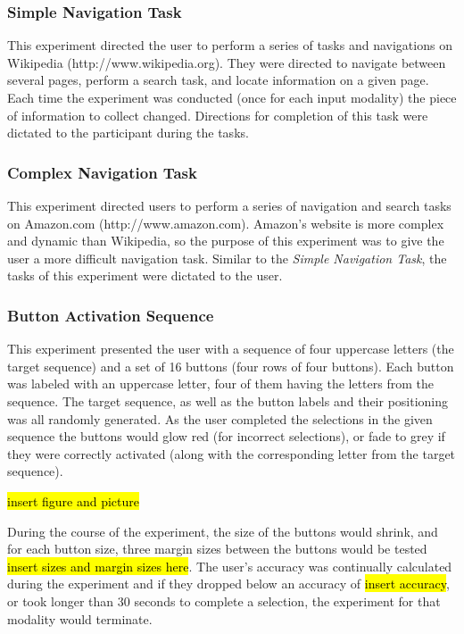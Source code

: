 \documentclass{sigchi}
\begin{document}
\subsubsection{Simple Navigation Task}
This experiment directed the user to perform a series of tasks and 
navigations on Wikipedia (http://www.wikipedia.org). They were directed
to navigate between several pages, perform a search task, and locate
information on a given page. Each time the experiment was conducted (once
for each input modality) the piece of information to collect changed.
Directions for completion of this task were dictated to the participant
during the tasks.

\subsubsection{Complex Navigation Task}
This experiment directed users to perform a series of navigation and
search tasks on Amazon.com (http://www.amazon.com). Amazon's website
is more complex and dynamic than Wikipedia, so the purpose of this 
experiment was to give the user a more difficult navigation task.
Similar to the \textit{Simple Navigation Task}, the tasks of this 
experiment were dictated to the user.

\subsubsection{Button Activation Sequence}
This experiment presented the user with a sequence of four uppercase 
letters (the target sequence) and a set of 16 buttons (four rows of 
four buttons). Each button was labeled with an uppercase letter, 
four of them having the letters from the sequence. The target sequence, 
as well as the button labels and their positioning was all randomly 
generated. As the user completed the selections in the given sequence
the buttons would glow red (for incorrect selections), or fade to grey
if they were correctly activated (along with the corresponding 
letter from the target sequence). 

\hl{insert figure and picture}

During the course of the experiment, the size of the buttons would 
shrink, and for each button size, three margin sizes between the buttons
would be tested \hl{insert sizes and margin sizes here}. The user's 
accuracy was continually calculated during the experiment and if they 
dropped below an accuracy of \hl{insert accuracy}, or took longer than
30 seconds to complete a selection, the experiment for that modality 
would terminate.
\end{document}

